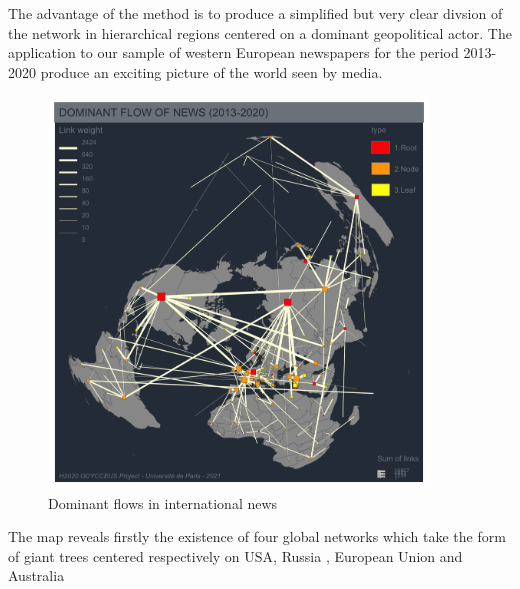 \documentclass[
]{article}
\begin{document}
The advantage of the method is to produce a simplified but very clear
divsion of the network in hierarchical regions centered on a dominant
geopolitical actor. The application to our sample of western European
newspapers for the period 2013-2020 produce an exciting picture of the
world seen by media.

\begin{figure}
\centering
\includegraphics[width=0.9\textwidth,height=\textheight]{img/DomNews_global.png}
\caption{Dominant flows in international news}
\end{figure}

The map reveals firstly the existence of four global networks which take
the form of giant trees centered respectively on USA, Russia , European
Union and Australia
\end{document}
